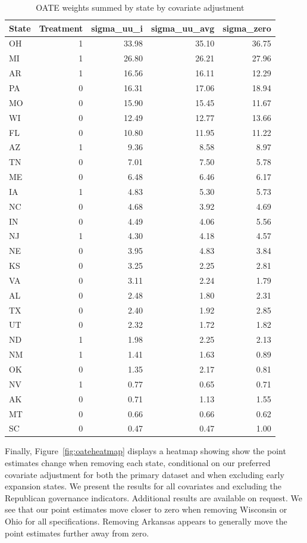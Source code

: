 \documentclass[12pt]{article}
\begin{document}
\begin{table}[ht]
\begin{tabular}{lrrrr}
  \toprule
State & Treatment & sigma\_uu\_i & sigma\_uu\_avg & sigma\_zero \\ 
  \midrule
OH & 1 & 33.98 & 35.10 & 36.75 \\ 
  MI & 1 & 26.80 & 26.21 & 27.96 \\ 
  AR & 1 & 16.56 & 16.11 & 12.29 \\ 
  PA & 0 & 16.31 & 17.06 & 18.94 \\ 
  MO & 0 & 15.90 & 15.45 & 11.67 \\ 
  WI & 0 & 12.49 & 12.77 & 13.66 \\ 
  FL & 0 & 10.80 & 11.95 & 11.22 \\ 
  AZ & 1 & 9.36 & 8.58 & 8.97 \\ 
  TN & 0 & 7.01 & 7.50 & 5.78 \\ 
  ME & 0 & 6.48 & 6.46 & 6.17 \\ 
  IA & 1 & 4.83 & 5.30 & 5.73 \\ 
  NC & 0 & 4.68 & 3.92 & 4.69 \\ 
  IN & 0 & 4.49 & 4.06 & 5.56 \\ 
  NJ & 1 & 4.30 & 4.18 & 4.57 \\ 
  NE & 0 & 3.95 & 4.83 & 3.84 \\ 
  KS & 0 & 3.25 & 2.25 & 2.81 \\ 
  VA & 0 & 3.11 & 2.24 & 1.79 \\ 
  AL & 0 & 2.48 & 1.80 & 2.31 \\ 
  TX & 0 & 2.40 & 1.92 & 2.85 \\ 
  UT & 0 & 2.32 & 1.72 & 1.82 \\ 
  ND & 1 & 1.98 & 2.25 & 2.13 \\ 
  NM & 1 & 1.41 & 1.63 & 0.89 \\ 
  OK & 0 & 1.35 & 2.17 & 0.81 \\ 
  NV & 1 & 0.77 & 0.65 & 0.71 \\ 
  AK & 0 & 0.71 & 1.13 & 1.55 \\ 
  MT & 0 & 0.66 & 0.66 & 0.62 \\ 
  SC & 0 & 0.47 & 0.47 & 1.00 \\ 
  \bottomrule
\end{tabular}
\caption{OATE weights summed by state by covariate adjustment}
\label{tab:oatestateweights}
\end{table}

Finally, Figure~\ref{fig:oateheatmap} displays a heatmap showing show the point estimates change when removing each state, conditional on our preferred covariate adjustment for both the primary dataset and when excluding early expansion states. We present the results for all covariates and excluding the Republican governance indicators. Additional results are available on request.  We see that our point estimates move closer to zero when removing Wisconsin or Ohio for all specifications. Removing Arkansas appears to generally move the point estimates further away from zero.
\end{document}
